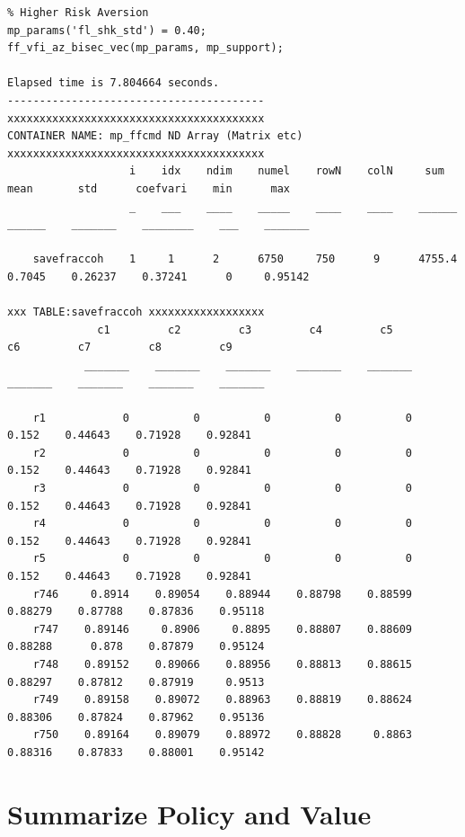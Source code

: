 \documentclass[
]{book}
\begin{document}
\begin{verbatim}
% Higher Risk Aversion
mp_params('fl_shk_std') = 0.40;
ff_vfi_az_bisec_vec(mp_params, mp_support);

Elapsed time is 7.804664 seconds.
----------------------------------------
xxxxxxxxxxxxxxxxxxxxxxxxxxxxxxxxxxxxxxxx
CONTAINER NAME: mp_ffcmd ND Array (Matrix etc)
xxxxxxxxxxxxxxxxxxxxxxxxxxxxxxxxxxxxxxxx
                   i    idx    ndim    numel    rowN    colN     sum       mean       std      coefvari    min      max  
                   _    ___    ____    _____    ____    ____    ______    ______    _______    ________    ___    _______

    savefraccoh    1     1      2      6750     750      9      4755.4    0.7045    0.26237    0.37241      0     0.95142

xxx TABLE:savefraccoh xxxxxxxxxxxxxxxxxx
              c1         c2         c3         c4         c5         c6         c7         c8         c9   
            _______    _______    _______    _______    _______    _______    _______    _______    _______

    r1            0          0          0          0          0      0.152    0.44643    0.71928    0.92841
    r2            0          0          0          0          0      0.152    0.44643    0.71928    0.92841
    r3            0          0          0          0          0      0.152    0.44643    0.71928    0.92841
    r4            0          0          0          0          0      0.152    0.44643    0.71928    0.92841
    r5            0          0          0          0          0      0.152    0.44643    0.71928    0.92841
    r746     0.8914    0.89054    0.88944    0.88798    0.88599    0.88279    0.87788    0.87836    0.95118
    r747    0.89146     0.8906     0.8895    0.88807    0.88609    0.88288      0.878    0.87879    0.95124
    r748    0.89152    0.89066    0.88956    0.88813    0.88615    0.88297    0.87812    0.87919     0.9513
    r749    0.89158    0.89072    0.88963    0.88819    0.88624    0.88306    0.87824    0.87962    0.95136
    r750    0.89164    0.89079    0.88972    0.88828     0.8863    0.88316    0.87833    0.88001    0.95142
\end{verbatim}

\hypertarget{summarize-policy-and-value}{%
\chapter{Summarize Policy and Value}\label{summarize-policy-and-value}}
\end{document}
